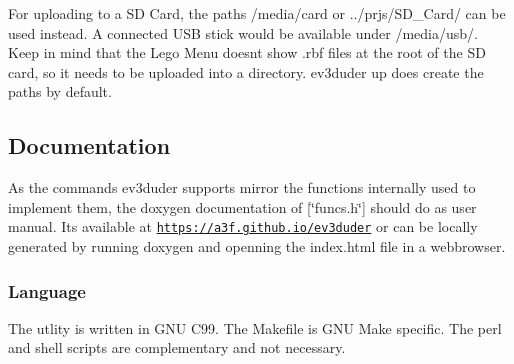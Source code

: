For uploading to a S\+D Card, the paths {\ttfamily /media/card} or {\ttfamily ../prjs/\+S\+D\+\_\+\+Card/} can be used instead. A connected U\+S\+B stick would be available under {\ttfamily /media/usb/}. Keep in mind that the Lego Menu doesn\textquotesingle{}t show .rbf files at the root of the S\+D card, so it needs to be uploaded into a directory. {\ttfamily ev3duder up} does create the paths by default.

\subsection*{Documentation}

As the commands ev3duder supports mirror the functions internally used to implement them, the doxygen documentation of \mbox{[}\char`\"{}funcs.\+h\char`\"{}\mbox{]} should do as user manual. It\textquotesingle{}s available at \href{https://a3f.github.io/ev3duder}{\tt https\+://a3f.\+github.\+io/ev3duder} or can be locally generated by running {\ttfamily doxygen} and openning the index.\+html file in a webbrowser.

\subsubsection*{Language}

The utlity is written in G\+N\+U C99. The Makefile is G\+N\+U Make specific. The perl and shell scripts are complementary and not necessary. 